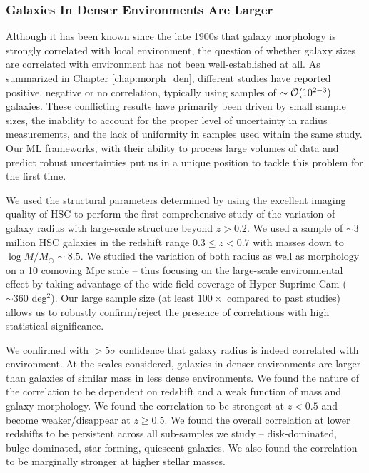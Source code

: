 \subsubsection{Galaxies In Denser Environments Are Larger} \label{sec_conc:morph_den} 

Although it has been known since the late 1900s that galaxy morphology is strongly correlated with local environment, the question of whether galaxy sizes are correlated with environment has not been well-established at all. As summarized in Chapter \ref{chap:morph_den}, different studies have reported positive, negative or no correlation, typically using samples of $\sim \mathcal{O}(10^{2-3})$ galaxies. These conflicting results have primarily been driven by small sample sizes, the inability to account for the proper level of uncertainty in radius measurements, and the lack of uniformity in samples used within the same study. Our ML frameworks, with their ability to process large volumes of data and predict robust uncertainties put us in a unique position to tackle this problem for the first time. 

We used the structural parameters determined by \gampen{} using the excellent imaging quality of HSC to perform the first comprehensive study of the variation of galaxy radius with large-scale structure beyond $z > 0.2$. We used a sample of $\sim3$ million HSC galaxies in the redshift range $0.3 \leq z < 0.7$ with masses down to $\log M/M_{\odot}\sim8.5$. We studied the variation of both radius as well as morphology on a 10 comoving Mpc scale -- thus focusing on the large-scale environmental effect by taking advantage of the wide-field coverage of Hyper Suprime-Cam ($\sim 360$ deg$^2$). Our large sample size (at least $100\times$ compared to past studies) allows us to robustly confirm/reject the presence of correlations with high statistical significance. 

We confirmed with $>5\sigma$ confidence that galaxy radius is indeed correlated with environment. At the scales considered, galaxies in denser environments are larger than galaxies of similar mass in less dense environments. We found the nature of the correlation to be dependent on redshift and a weak function of mass and galaxy morphology. We found the correlation to be strongest at $z < 0.5$ and become weaker/disappear at $z \geq 0.5$. We found the overall correlation at lower redshifts to be persistent across all sub-samples we study -- disk-dominated, bulge-dominated, star-forming, quiescent galaxies. We also found the correlation to be marginally stronger at higher stellar masses. 

